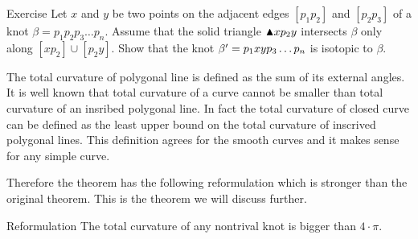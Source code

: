 \begin{thm}{Exercise}\label{ex:triangle-isotopy}
Let $x$ and $y$ be two points on the adjacent edges $[p_1p_2]$ and $[p_2p_3]$ of a knot $\beta=p_1p_2p_3\dots p_n$.
Assume that the solid triangle $\blacktriangle xp_2y$ intersects $\beta$ only along $[xp_2]\cup [p_2y]$.
Show that the knot $\beta'\z=p_1xyp_3\dots p_n$ is isotopic to $\beta$.
\end{thm}

The total curvature of polygonal line is defined as the sum of its external angles.
It is well known that total curvature of a curve cannot be smaller than total curvature of an insribed polygonal line.
In fact the total curvature of closed curve can be defined as the least upper bound on the total curvature of inscrived polygonal lines.
This definition agrees for the smooth curves and it makes sense for any simple curve.

Therefore the theorem has the following reformulation which is stronger than the original theorem.
This is the theorem we will discuss further.

\begin{thm}{Reformulation}\label{thm:fary-milnor}
The total curvature of any nontrival knot is bigger than $4\cdot\pi$. 
\end{thm}


